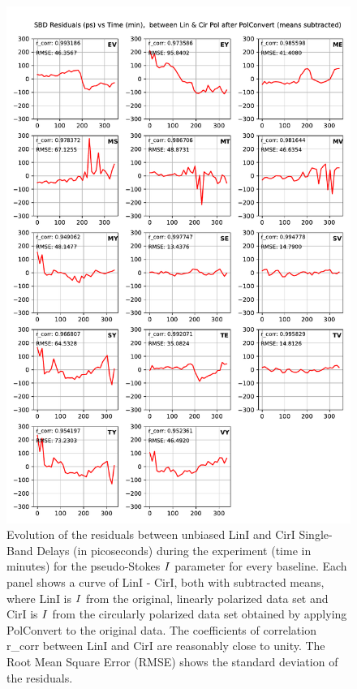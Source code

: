 \documentclass[letterpaper,twoside,12pt]{article}
\begin{document}
\begin{figure}[ht!]
  \begin{center}
  \includegraphics[width=33pc]{SBD_Lin_I_minus_Cir_I.pdf}
  \caption{\small Evolution of the residuals between unbiased LinI and CirI Single-Band Delays (in picoseconds) during the experiment (time in minutes) for the pseudo-Stokes $\protect I$ parameter for every baseline. Each panel shows a curve of LinI - CirI, both with subtracted means, where LinI is $\protect I$ from the original, linearly polarized data set and CirI is $\protect I$ from the circularly polarized data set obtained by applying PolConvert to the original data. The coefficients of correlation r\_corr between LinI and CirI are reasonably close to unity. The Root Mean Square Error (RMSE) shows the standard deviation of the residuals.}
  \label{sbd_lin_minus_cir}
  \end{center}
\end{figure}
\end{document}
